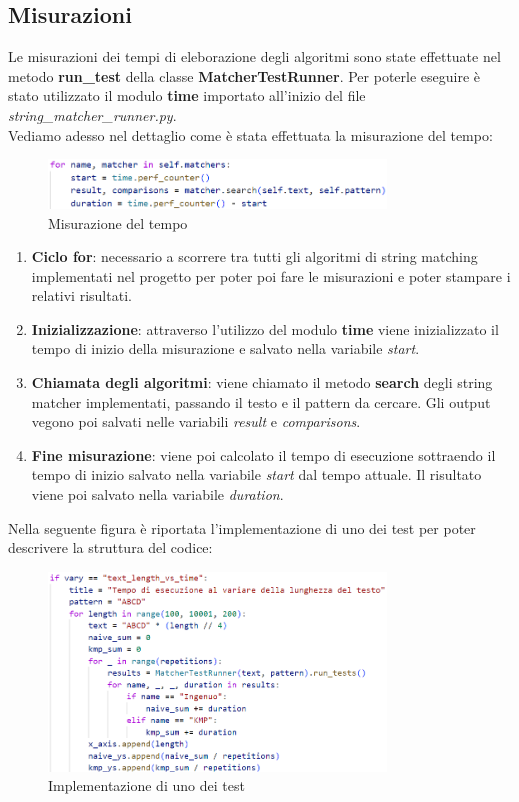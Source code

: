 \documentclass{article}
\begin{document}
\subsection{Misurazioni}
Le misurazioni dei tempi di eleborazione degli algoritmi sono state effettuate nel metodo \textbf{run\_test} della classe \textbf{MatcherTestRunner}. Per poterle eseguire è stato utilizzato il modulo \textbf{time} importato all'inizio del file \textit{string\_matcher\_runner.py}.\\
Vediamo adesso nel dettaglio come è stata effettuata la misurazione del tempo:
\begin{figure}[H]
    \centering
    \includegraphics[width=0.8\textwidth]{img/Tempo.png}
    \caption{Misurazione del tempo}
    \label{fig:time-measurement}
\end{figure}
\begin{enumerate}
    \item \textbf{Ciclo for}: necessario a scorrere tra tutti gli algoritmi di string matching implementati nel progetto per poter poi fare le misurazioni e poter stampare i relativi risultati.
    \item \textbf{Inizializzazione}: attraverso l'utilizzo del modulo \textbf{time} viene inizializzato il tempo di inizio della misurazione e salvato nella variabile \textit{start}.
    \item \textbf{Chiamata degli algoritmi}: viene chiamato il metodo \textbf{search} degli string matcher implementati, passando il testo e il pattern da cercare. Gli output vegono poi salvati nelle variabili \textit{result} e \textit{comparisons}.
    \item \textbf{Fine misurazione}: viene poi calcolato il tempo di esecuzione sottraendo il tempo di inizio salvato nella variabile \textit{start} dal tempo attuale. Il risultato viene poi salvato nella variabile \textit{duration}.
\end{enumerate}
Nella seguente figura è riportata l'implementazione di uno dei test per poter descrivere la struttura del codice:
\begin{figure}[H]
    \centering
    \includegraphics[width=0.8\textwidth]{img/Test.png}
    \caption{Implementazione di uno dei test}
    \label{fig:test-implementation}
\end{figure}
\end{document}
